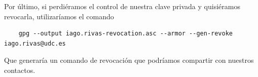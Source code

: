 Por último, si perdiéramos el control de nuestra clave privada y quisiéramos revocarla, utilizaríamos el comando

\begin{verbatim}
    gpg --output iago.rivas-revocation.asc --armor --gen-revoke iago.rivas@udc.es
\end{verbatim}

Que generaría un comando de revocación que podríamos compartir con nuestros contactos.
